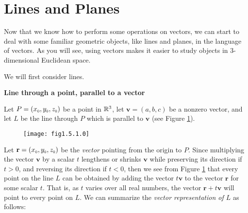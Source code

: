 \newpage
\section{Lines and Planes}
Now that we know how to perform some operations on vectors, we can start to deal with some familiar geometric objects,
like lines and planes, in the language of vectors. 
As you will see, using vectors makes it easier
to study objects in 3-dimensional Euclidean space. 

We will first consider lines.\medskip

\par\noindent\textbf{\large{Line through a point, parallel to a vector}}\normalsize\smallskip

Let $P = (x_{\scriptscriptstyle 0},y_{\scriptscriptstyle 0},z_{\scriptscriptstyle 0})$ be a point in $\mathbb{R}^{3}$, let $\mathbf{v} = (a,b,c)$ be a nonzero
vector, and let $L$ be the line through $P$ which is parallel to $\mathbf{v}$ (see Figure \ref{fig:linepvec}).

\begin{figure}[h]
 \begin{center}
  \texttt{[image: fig1.5.1.0]}
 \end{center}
 \caption[]{}
 \label{fig:linepvec}
\end{figure}

Let $\mathbf{r} = (x_{\scriptscriptstyle 0},y_{\scriptscriptstyle 0},z_{\scriptscriptstyle 0})$ be the \emph{vector} pointing from the origin to $P$. Since
multiplying the vector $\mathbf{v}$ by a scalar $t$ lengthens or shrinks $\mathbf{v}$ while preserving its direction
if $t > 0$, and reversing its direction if $t < 0$, then we see from Figure \ref{fig:linepvec} that every point on the
line $L$ can be obtained by adding the vector $t \mathbf{v}$ to the vector $\mathbf{r}$ for some scalar $t$. That is, as
$t$ varies over all real numbers, the vector $\mathbf{r} + t \mathbf{v}$ will point to every point on $L$. We can
summarize the \emph{vector representation of $L$} as follows:\smallskip
{}

